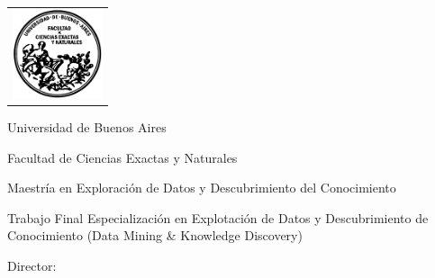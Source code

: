 \newcommand{\HRule}{\rule{\linewidth}{0.2mm}}
%
\thispagestyle{empty}

\begin{center}\leavevmode

\vspace{-2cm}

\begin{tabular}{l}
\includegraphics[width=2.6cm]{logofcen.pdf}
\end{tabular}


{\large \sc Universidad de Buenos Aires

Facultad de Ciencias Exactas y Naturales}

\vspace{0.5cm}

{\large \sc Maestría en Exploración de Datos y 
Descubrimiento del Conocimiento}

\vspace{5.0cm}


\begin{huge}
\textbf{\tituloTesis}
\end{huge}

\vspace{2cm}

{\large Trabajo Final Especialización en Explotación de Datos y Descubrimiento de Conocimiento (Data Mining \& Knowledge Discovery) }

\vspace{2cm}

{\Large \autor}

\end{center}

\vfill

{\large

{Director: \director}



\vspace{.2cm}

\lugar
}

\newpage\thispagestyle{empty}
